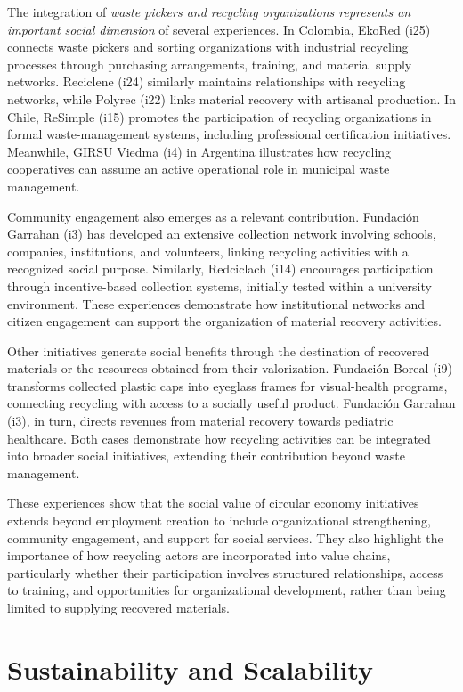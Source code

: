 \documentclass[
  12pt,
  oneside]{book}
\begin{document}
The integration of \emph{waste pickers and recycling organizations
represents an important social dimension} of several experiences. In
Colombia, EkoRed (i25) connects waste pickers and sorting organizations
with industrial recycling processes through purchasing arrangements,
training, and material supply networks. Reciclene (i24) similarly
maintains relationships with recycling networks, while Polyrec (i22)
links material recovery with artisanal production. In Chile, ReSimple
(i15) promotes the participation of recycling organizations in formal
waste-management systems, including professional certification
initiatives. Meanwhile, GIRSU Viedma (i4) in Argentina illustrates how
recycling cooperatives can assume an active operational role in
municipal waste management.

Community engagement also emerges as a relevant contribution. Fundación
Garrahan (i3) has developed an extensive collection network involving
schools, companies, institutions, and volunteers, linking recycling
activities with a recognized social purpose. Similarly, Redciclach (i14)
encourages participation through incentive-based collection systems,
initially tested within a university environment. These experiences
demonstrate how institutional networks and citizen engagement can
support the organization of material recovery activities.

Other initiatives generate social benefits through the destination of
recovered materials or the resources obtained from their valorization.
Fundación Boreal (i9) transforms collected plastic caps into eyeglass
frames for visual-health programs, connecting recycling with access to a
socially useful product. Fundación Garrahan (i3), in turn, directs
revenues from material recovery towards pediatric healthcare. Both cases
demonstrate how recycling activities can be integrated into broader
social initiatives, extending their contribution beyond waste
management.

These experiences show that the social value of circular economy
initiatives extends beyond employment creation to include organizational
strengthening, community engagement, and support for social services.
They also highlight the importance of how recycling actors are
incorporated into value chains, particularly whether their participation
involves structured relationships, access to training, and opportunities
for organizational development, rather than being limited to supplying
recovered materials.

\section{Sustainability and
Scalability}\label{sustainability-and-scalability}
\end{document}
